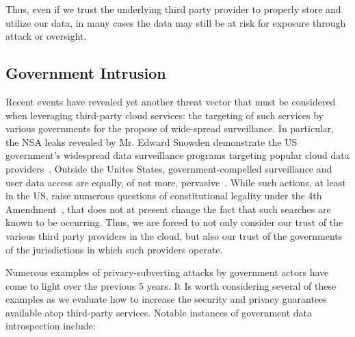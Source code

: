 Thus, even if we trust the underlying third party provider to properly
store and utilize our data, in many cases the data may still be at
risk for exposure through attack or oversight.

\subsection{Government Intrusion}

Recent events have revealed yet another threat vector that must be
considered when leveraging third-party cloud services: the targeting
of such services by various governments for the propose of wide-spread
surveillance. In particular, the NSA leaks revealed by Mr. Edward
Snowden demonstrate the US government's widespread data surveillance
programs targeting popular cloud data
providers~\cite{greenwald-prism}.  Outside the Unites States,
government-compelled surveillance and user data access are equally, of
not more, pervasive~\cite{netfreedom2015}.  While such
actions, at least in the US, raise numerous questions of
constitutional legality under the 4th
Amendment~\cite{us-constitution-amend4}, that does not at present
change the fact that such searches are known to be occurring. Thus, we
are forced to not only consider our trust of the various third party
providers in the cloud, but also our trust of the governments of the
jurisdictions in which such providers operate.

Numerous examples of privacy-subverting attacks by government actors
have come to light over the previous 5 years. It Is worth considering
several of these examples as we evaluate how to increase the security
and privacy guarantees available atop third-party services. Notable
instances of government data introspection include:

